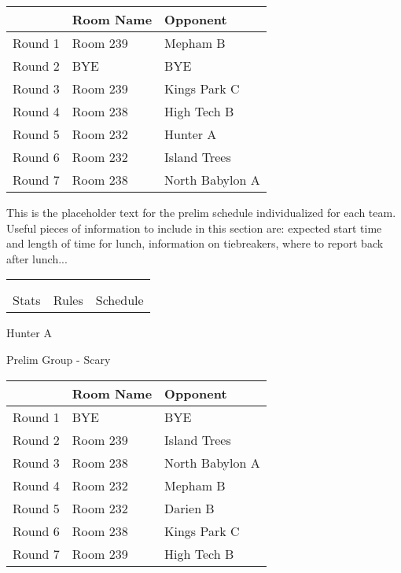 \documentclass{article}%
\begin{document}
\vspace*{4pt}%
\begin{tabularx}{\textwidth}{|c|Y|Y|}%
\hline%
&Room Name&Opponent\\%
\hline%
Round 1&Room 239&Mepham B\\%
Round 2&BYE&BYE\\%
Round 3&Room 239&Kings Park C\\%
Round 4&Room 238&High Tech B\\%
Round 5&Room 232&Hunter A\\%
Round 6&Room 232&Island Trees\\%
Round 7&Room 238&North Babylon A\\%
\hline%
\end{tabularx}%
\vspace*{30pt}%
\linebreak%
This is the placeholder text for the prelim schedule individualized for each team. Useful pieces of information to include in this section are: expected start time and length of time for lunch, information on tiebreakers, where to report back after lunch...%
\vspace*{30pt}%
\newline%
%
\begin{tabularx}{\textwidth}{YYY}%
  &  &  \\%
\\%
Stats&Rules&Schedule\\%
\end{tabularx}%
\newpage%
%
\begin{center}%
\begin{Huge}%
Hunter A%
\end{Huge}%
\vspace*{12pt}%
\linebreak%
\begin{Large}%
Prelim Group {-} Scary%
\end{Large}%
\end{center}%
\vspace*{4pt}%
\begin{tabularx}{\textwidth}{|c|Y|Y|}%
\hline%
&Room Name&Opponent\\%
\hline%
Round 1&BYE&BYE\\%
Round 2&Room 239&Island Trees\\%
Round 3&Room 238&North Babylon A\\%
Round 4&Room 232&Mepham B\\%
Round 5&Room 232&Darien B\\%
Round 6&Room 238&Kings Park C\\%
Round 7&Room 239&High Tech B\\%
\hline%
\end{tabularx}%
\end{document}
